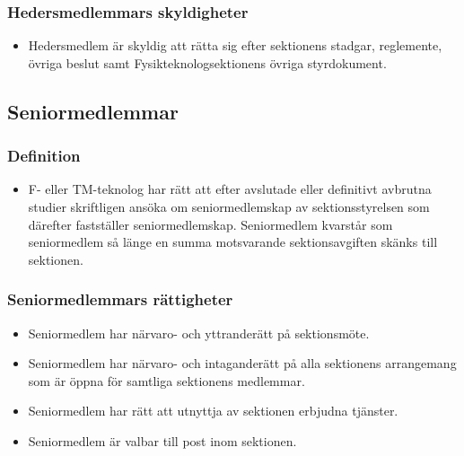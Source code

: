 \documentclass[11pt,a4paper]{article}
\begin{document}
\subsubsection{Hedersmedlemmars skyldigheter}
\begin{itemize}

  \item Hedersmedlem är skyldig att rätta sig efter sektionens stadgar,
  regle\-mente, övriga beslut samt  Fysikteknologsektionens övriga styrdokument.

\end{itemize}



\subsection{Seniormedlemmar}
\subsubsection{Definition}
\begin{itemize}

  \item F- eller TM-teknolog har rätt att efter avslutade eller definitivt
  avbrutna studier skriftligen ansöka om seniormedlemskap av sektionsstyrelsen
  som därefter fastställer seniormedlemskap. Seniormedlem kvarstår som
  senior\-med\-lem så länge en summa motsvarande sektionsavgiften skänks till sektionen.

\end{itemize}



\subsubsection{Seniormedlemmars rättigheter}
\begin{itemize}

  \item Seniormedlem har närvaro- och yttranderätt på sektionsmöte.

  \item Seniormedlem har närvaro- och intaganderätt på alla
   sektionens arrangemang som är öppna för samtliga sektionens
   medlemmar.

  \item Seniormedlem har rätt att utnyttja av sektionen erbjudna
   tjänster.
   
  \item Seniormedlem är valbar till post inom sektionen.

\end{itemize}
\end{document}

